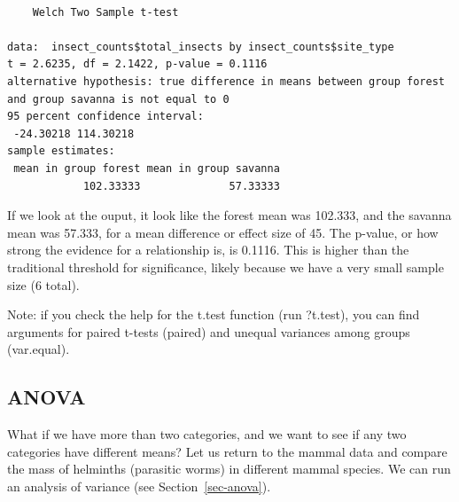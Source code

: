\documentclass[
  letterpaper,
  DIV=11,
  numbers=noendperiod]{scrreprt}
\newenvironment{Shaded}{\begin{snugshade}}{\end{snugshade}}
\newcommand{\AttributeTok}[1]{\textcolor[rgb]{0.40,0.45,0.13}{#1}}
\newcommand{\DocumentationTok}[1]{\textcolor[rgb]{0.37,0.37,0.37}{\textit{#1}}}
\newcommand{\FunctionTok}[1]{\textcolor[rgb]{0.28,0.35,0.67}{#1}}
\newcommand{\NormalTok}[1]{\textcolor[rgb]{0.00,0.23,0.31}{#1}}
\newcommand{\OtherTok}[1]{\textcolor[rgb]{0.00,0.23,0.31}{#1}}
\newcommand{\SpecialCharTok}[1]{\textcolor[rgb]{0.37,0.37,0.37}{#1}}
\begin{document}
\begin{Shaded}
\end{Shaded}

\begin{verbatim}

    Welch Two Sample t-test

data:  insect_counts$total_insects by insect_counts$site_type
t = 2.6235, df = 2.1422, p-value = 0.1116
alternative hypothesis: true difference in means between group forest and group savanna is not equal to 0
95 percent confidence interval:
 -24.30218 114.30218
sample estimates:
 mean in group forest mean in group savanna 
            102.33333              57.33333 
\end{verbatim}

If we look at the ouput, it look like the forest mean was 102.333, and
the savanna mean was 57.333, for a mean difference or effect size of 45.
The p-value, or how strong the evidence for a relationship is, is
0.1116. This is higher than the traditional threshold for significance,
likely because we have a very small sample size (6 total).

Note: if you check the help for the t.test function (run ?t.test), you
can find arguments for paired t-tests (paired) and unequal variances
among groups (var.equal).

\hypertarget{anova}{%
\subsection{ANOVA}\label{anova}}

What if we have more than two categories, and we want to see if any two
categories have different means? Let us return to the mammal data and
compare the mass of helminths (parasitic worms) in different mammal
species. We can run an analysis of variance (see
Section~\ref{sec-anova}).

\begin{Shaded}
\end{Shaded}
\end{document}
